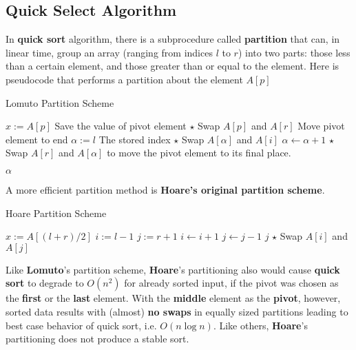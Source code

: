 \subsection{Quick Select Algorithm}
In \textbf{quick sort} algorithm, there is a subprocedure called \textbf{partition} that can, in linear time, group an array (ranging from indices $l$ to $r$) into two parts: those less than a certain element, and those greater than or equal to the element. Here is pseudocode that performs a partition about the element $A[p]$
\setcounter{algorithm}{0}
\begin{algorithm}[H]
\caption{Lomuto Partition Scheme}
\begin{algorithmic}[1]
\State $x:=A[p]$ \Comment Save the value of pivot element
\State $\star$ Swap $A[p]$ and $A[r]$ \Comment Move pivot element to end
\State $\alpha:=l$ \Comment The stored index
\State $\star$ Swap $A[\alpha]$ and $A[i]$
\State $\alpha\gets\alpha+1$
\EndIf
\EndFor
\State $\star$ Swap $A[r]$ and $A[\alpha]$ to move the pivot element to its final place.
\end{algorithmic}
\end{algorithm}
\begin{algorithm}[H]
\begin{algorithmic}[1]
\State \Return $\alpha$
\EndProcedure
\end{algorithmic}
\end{algorithm}
A more efficient partition method is \textbf{Hoare's original partition scheme}.
\begin{algorithm}[H]
\caption{Hoare Partition Scheme}
\begin{algorithmic}[1]
\State $x:=A[(l+r)/2]$
\State $i:=l-1$
\State $j:=r+1$
\Loop
\Repeat
\State $i\gets i+1$
\Repeat
\State $j\gets j-1$
\State \Return $j$
\EndIf
\State $\star$ Swap $A[i]$ and $A[j]$
\EndLoop
\EndProcedure
\end{algorithmic}
\end{algorithm}
Like \textbf{Lomuto}'s partition scheme, \textbf{Hoare}'s partitioning also would cause \textbf{quick sort} to degrade to $O(n^2)$ for already sorted input, if the pivot was chosen as the \textbf{first} or the \textbf{last} element. With the \textbf{middle} element as the \textbf{pivot}, however, sorted data results with (almost) \textbf{no swaps} in equally sized partitions leading to best case behavior of quick sort, i.e. $O(n \log n)$. Like others, \textbf{Hoare}'s partitioning does not produce a stable sort.
